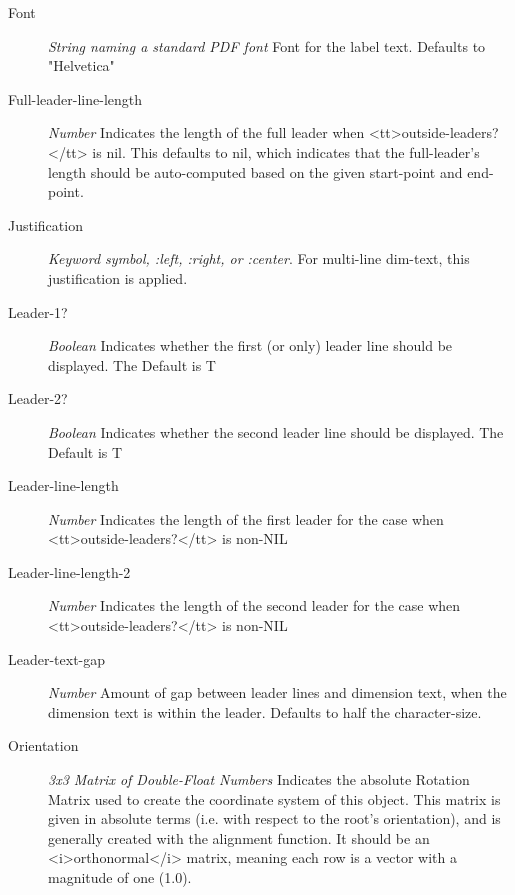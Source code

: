 \documentclass [11pt]{book}
\begin{document}
\begin{itemize}
\begin{description}
\item [Font]
\emph{String naming a standard PDF font} Font for the label text. Defaults to "Helvetica"


\item [Full-leader-line-length]
\emph{Number} Indicates the length of the full leader when <tt>outside-leaders?</tt> is nil. This defaults to nil,
which indicates that the full-leader's length should be auto-computed based on the given start-point and end-point.


\item [Justification]
\emph{Keyword symbol, :left, :right, or :center}.
For multi-line dim-text, this justification is applied.


\item [Leader-1?]
\emph{Boolean} Indicates whether the first (or only) leader line should be displayed. The Default is T


\item [Leader-2?]
\emph{Boolean} Indicates whether the second leader line should be displayed. The Default is T


\item [Leader-line-length]
\emph{Number} Indicates the length of the first leader for the case when <tt>outside-leaders?</tt> is non-NIL


\item [Leader-line-length-2]
\emph{Number} Indicates the length of the second leader for the case when <tt>outside-leaders?</tt> is non-NIL


\item [Leader-text-gap]
\emph{Number} Amount of gap between leader lines and dimension text, when the dimension text is within the leader.
Defaults to half the character-size.


\item [Orientation]
\emph{3x3 Matrix of Double-Float Numbers} Indicates the absolute Rotation Matrix used to create
the coordinate system of this object. This matrix is given in absolute terms (i.e. with
respect to the root's orientation), and is generally created with the alignment function.
It should be an <i>orthonormal</i> matrix, meaning each row is a vector with a magnitude
of one (1.0).



\end{description}
\end{itemize}
\end{document}
